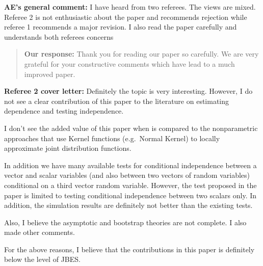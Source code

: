 \documentclass[
  12pt,
  letterpaper]{article}
\author{}
\date{\vspace{-2.5em}}
\numberwithin{equation}{section}
\begin{document}

\vspace{1cm}

\textbf{AE's general comment:} I have heard from two referees. The views are mixed. Referee 2 is not enthusiastic about the paper and recommends rejection while referee 1 recommends a major revision. I also read the paper carefully and understands both referees concerns

\begin{quote}
\textbf{Our response:} Thank you for reading our paper so carefully. We are very grateful for your constructive comments which have lead to a much improved paper.
\end{quote}

\textbf{Referee 2 cover letter:} Definitely the topic is very interesting. However, I do not see a clear contribution of this paper to the literature on estimating dependence and testing independence.

I don't see the added value of this paper when is compared to the nonparametric approaches that use Kernel functions (e.g.~Normal Kernel) to locally approximate joint distribution functions.

In addition we have many available tests for conditional independence between a vector and scalar variables (and also between two vectors of random variables) conditional on a third vector random variable. However, the test proposed in the paper is limited to testing conditional independence between two scalars only. In addition, the simulation results are definitely not better than the existing tests.

Also, I believe the asymptotic and bootstrap theories are not complete. I also made other comments.

For the above reasons, I believe that the contributions in this paper is definitely below the level of JBES.
\end{document}
